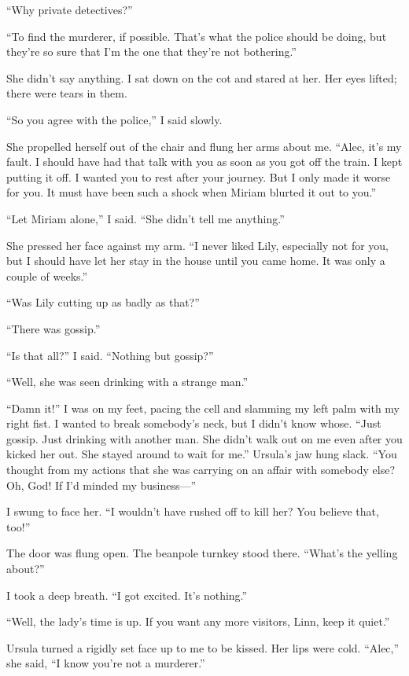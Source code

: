 \documentclass{novel}
\begin{document}
“Why private detectives?”

“To find the murderer, if possible. That’s what the police should be doing, but they’re so sure that I’m the one that they’re not bothering.”

She didn’t say anything. I sat down on the cot and stared at her. Her eyes lifted; there were tears in them.

“So you agree with the police,” I said slowly.

She propelled herself out of the chair and flung her arms about me. “Alec, it’s my fault. I should have had that talk with you as soon as you got off the train. I kept putting it off. I wanted you to rest after your journey. But I only made it worse for you. It must have been such a shock when Miriam blurted it out to you.”

“Let Miriam alone,” I said. “She didn’t tell me anything.”

She pressed her face against my arm. “I never liked Lily, especially not for you, but I should have let her stay in the house until you came home. It was only a couple of weeks.”

“Was Lily cutting up as badly as that?”

“There was gossip.”

“Is that all?” I said. “Nothing but gossip?”

“Well, she was seen drinking with a strange man.”

“Damn it!” I was on my feet, pacing the cell and slamming my left palm with my right fist. I wanted to break somebody’s neck, but I didn’t know whose. “Just gossip. Just drinking with another man. She didn’t walk out on me even after you kicked her out. She stayed around to wait for me.” Ursula’s jaw hung slack. “You thought from my actions that she was carrying on an affair with somebody else? Oh, God! If I’d minded my business—”

I swung to face her. “I wouldn’t have rushed off to kill her? You believe that, too!”

The door was flung open. The beanpole turnkey stood there. “What’s the yelling about?”

I took a deep breath. “I got excited. It’s nothing.”

“Well, the lady’s time is up. If you want any more visitors, Linn, keep it quiet.”

Ursula turned a rigidly set face up to me to be kissed. Her lips were cold. “Alec,” she said, “I know you’re not a murderer.”
\end{document}
